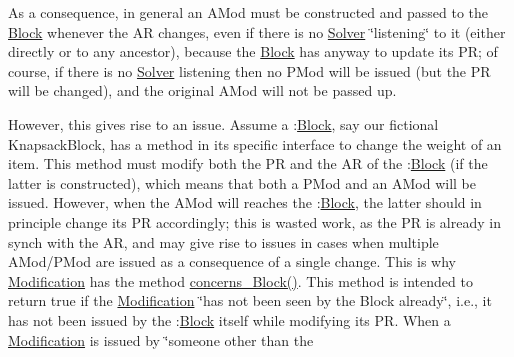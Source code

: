 As a consequence, in general an A\+Mod must be constructed and passed to the \mbox{\hyperlink{class_s_m_spp__di__unipi__it_1_1_block}{Block}} whenever the AR changes, even if there is no \mbox{\hyperlink{class_s_m_spp__di__unipi__it_1_1_solver}{Solver}} \char`\"{}listening\char`\"{} to it (either directly or to any ancestor), because the \mbox{\hyperlink{class_s_m_spp__di__unipi__it_1_1_block}{Block}} has anyway to update its PR; of course, if there is no \mbox{\hyperlink{class_s_m_spp__di__unipi__it_1_1_solver}{Solver}} listening then no P\+Mod will be issued (but the PR will be changed), and the original A\+Mod will not be passed up.

However, this gives rise to an issue. Assume a \+:\mbox{\hyperlink{class_s_m_spp__di__unipi__it_1_1_block}{Block}}, say our fictional Knapsack\+Block, has a method in its specific interface to change the weight of an item. This method must modify both the PR and the AR of the \+:\mbox{\hyperlink{class_s_m_spp__di__unipi__it_1_1_block}{Block}} (if the latter is constructed), which means that both a P\+Mod and an A\+Mod will be issued. However, when the A\+Mod will reaches the \+:\mbox{\hyperlink{class_s_m_spp__di__unipi__it_1_1_block}{Block}}, the latter should in principle change its PR accordingly; this is wasted work, as the PR is already in synch with the AR, and may give rise to issues in cases when multiple A\+Mod/\+P\+Mod are issued as a consequence of a single change. This is why \mbox{\hyperlink{class_s_m_spp__di__unipi__it_1_1_modification}{Modification}} has the method \mbox{\hyperlink{class_s_m_spp__di__unipi__it_1_1_modification_a22fe0cccfc755cfd89b240587d1f1cad}{concerns\+\_\+\+Block()}}. This method is intended to return true if the \mbox{\hyperlink{class_s_m_spp__di__unipi__it_1_1_modification}{Modification}} \char`\"{}has not been seen by the
\+Block already\char`\"{}, i.\+e., it has not been issued by the \+:\mbox{\hyperlink{class_s_m_spp__di__unipi__it_1_1_block}{Block}} itself while modifying its PR. When a \mbox{\hyperlink{class_s_m_spp__di__unipi__it_1_1_modification}{Modification}} is issued by \char`\"{}someone other than the
